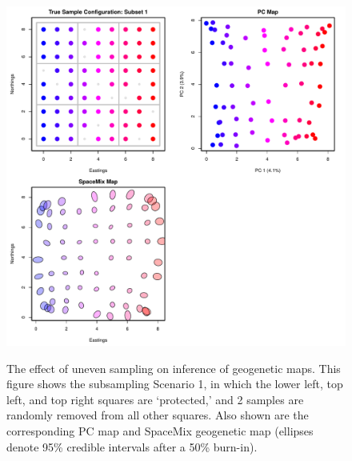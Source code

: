 \documentclass[10pt,letterpaper]{article}
\begin{document}
\begin{figure}
\centering
	{\includegraphics[width=\textwidth]{../figs/sims/grid_subsamp1.pdf}}
	\caption{The effect of uneven sampling on inference of geogenetic maps.  
			This figure shows the subsampling Scenario 1, 
			in which the lower left, top left, and top right squares are `protected,'
			and 2 samples are randomly removed from all other squares.
			Also shown are the corresponding PC map and 
			SpaceMix geogenetic map 
			(ellipses denote 95\% credible intervals after a 50\% burn-in).}\label{sfig:uneven_sampling_grid_subsamp1}
\end{figure}
\end{document}
